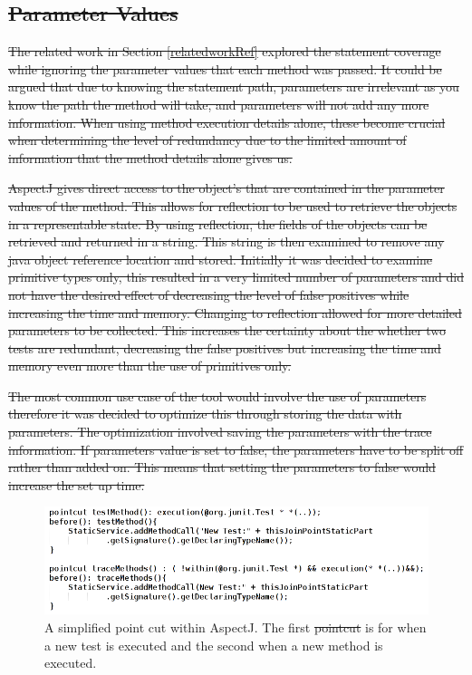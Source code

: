 \documentclass[11pt
              , a4paper
              , twoside
              , openright
              ]{report}
\providecommand{\DIFadd}[1]{{\protect\color{blue}\uwave{#1}}} %
\providecommand{\DIFdel}[1]{{\protect\color{red}\sout{#1}}}                      %
\providecommand{\DIFdelbegin}{} %
\providecommand{\DIFdelend}{} %
\providecommand{\DIFaddFL}[1]{\DIFadd{#1}} %
\providecommand{\DIFdelFL}[1]{\DIFdel{#1}} %
\providecommand{\DIFaddbeginFL}{} %
\providecommand{\DIFaddendFL}{} %
\providecommand{\DIFdelbeginFL}{} %
\providecommand{\DIFdelendFL}{} %
\begin{document}
\DIFdelbegin \subsection{\DIFdel{Parameter Values}}
\addtocounter{subsection}{-1}%
\DIFdel{The related work in Section \ref{relatedworkRef} explored the statement coverage while ignoring the parameter values that each method was passed. It could be argued that due to knowing the statement path, parameters are irrelevant as you know the path the method will take, and parameters will not add any more information. When using method execution details alone, these become crucial when determining the level of redundancy due to the limited amount of information that the method details alone gives us. 
}%

\DIFdel{AspectJ gives direct access to the object's that are contained in the parameter values of the method. This allows for reflection to be used to retrieve the objects in a representable state. By using reflection, the fields of the objects can be retrieved and returned in a string. This string is then examined to remove any java object reference location and stored. Initially it was decided to examine primitive types only, this resulted in a very limited number of parameters and did not have the desired effect of decreasing the level of false positives while increasing the time and memory. Changing to reflection allowed for more detailed parameters to be collected. This increases the certainty about the whether two tests are redundant, decreasing the false positives but increasing the time and memory even more than the use of primitives only. 
}%

\DIFdel{The most common use case of the tool would involve the use of parameters therefore it was decided to optimize this through storing the data with parameters. The optimization involved saving the parameters with the trace information. If parameters value is set to false, the parameters have to be split off rather than added on. This means that setting the parameters to false would increase the set up time.
}%

\DIFdelend \begin{figure}[h]
\begin{center}
\includegraphics[width = \textwidth]{aspect.png}
\end{center}
\caption{A simplified point cut within AspectJ. The first \DIFdelbeginFL \DIFdelFL{pointcut }\DIFdelendFL \DIFaddbeginFL \DIFaddFL{point cut }\DIFaddendFL is for when a new test is executed and the second when a new method is executed.}
\label{fig:aspectused}
\end{figure}
\end{document}
